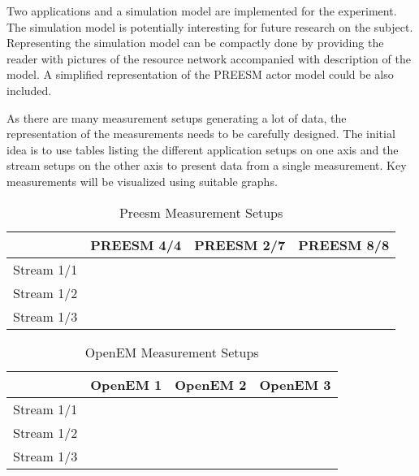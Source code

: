 Two applications and a simulation model are implemented for the experiment. The simulation model is potentially interesting for future research on the subject. Representing the simulation model can be compactly done by providing the reader with pictures of the resource network accompanied with description of the model. A simplified representation of the PREESM actor model could be also included.

As there are many measurement setups generating a lot of data, the representation of the measurements needs to be carefully designed. The initial idea is to use tables listing the different application setups on one axis and the stream setups on the other axis to present data from a single measurement. Key measurements will be visualized using suitable graphs.


\begin{table}[h]
\centering
\caption{Preesm Measurement Setups}
\label{my-label}
\begin{tabular}{|l|l|l|l|}
\hline
           & PREESM 4/4 & PREESM 2/7 & PREESM 8/8 \\ \hline
Stream 1/1 &            &            &            \\ \hline
Stream 1/2 &            &            &            \\ \hline
Stream 1/3 &            &            &            \\ \hline
\end{tabular}
\end{table}

\begin{table}[h]
\centering
\caption{OpenEM Measurement Setups}
\label{my-label}
\begin{tabular}{|l|l|l|l|}
\hline
           & OpenEM 1 & OpenEM 2 & OpenEM 3 \\ \hline
Stream 1/1 &          &          &          \\ \hline
Stream 1/2 &          &          &          \\ \hline
Stream 1/3 &          &          &          \\ \hline
\end{tabular}
\end{table}